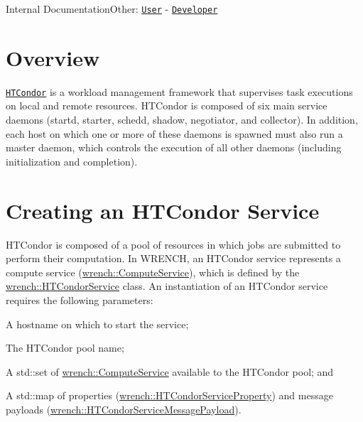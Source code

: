 Internal DocumentationOther\+: \href{../user/guide-htcondor.html}{\tt User} -\/ \href{../developer/guide-htcondor.html}{\tt Developer}\hypertarget{guide-htcondor_guide-htcondor-overview}{}\section{Overview}\label{guide-htcondor_guide-htcondor-overview}
\href{http://htcondor.org}{\tt H\+T\+Condor} is a workload management framework that supervises task executions on local and remote resources. H\+T\+Condor is composed of six main service daemons ({\ttfamily startd}, {\ttfamily starter}, {\ttfamily schedd}, {\ttfamily shadow}, {\ttfamily negotiator}, and {\ttfamily collector}). In addition, each host on which one or more of these daemons is spawned must also run a {\ttfamily master} daemon, which controls the execution of all other daemons (including initialization and completion).\hypertarget{guide-htcondor_guide-htcondor-creating}{}\section{Creating an H\+T\+Condor Service}\label{guide-htcondor_guide-htcondor-creating}
H\+T\+Condor is composed of a pool of resources in which jobs are submitted to perform their computation. In W\+R\+E\+N\+CH, an H\+T\+Condor service represents a compute service ({\ttfamily \hyperlink{classwrench_1_1_compute_service}{wrench\+::\+Compute\+Service}}), which is defined by the {\ttfamily \hyperlink{classwrench_1_1_h_t_condor_service}{wrench\+::\+H\+T\+Condor\+Service}} class. An instantiation of an H\+T\+Condor service requires the following parameters\+:


\begin{DoxyItemize}
\item A hostname on which to start the service;
\item The H\+T\+Condor pool name;
\item A {\ttfamily std\+::set} of {\ttfamily \hyperlink{classwrench_1_1_compute_service}{wrench\+::\+Compute\+Service}} available to the H\+T\+Condor pool; and
\item A {\ttfamily std\+::map} of properties ({\ttfamily \hyperlink{classwrench_1_1_h_t_condor_service_property}{wrench\+::\+H\+T\+Condor\+Service\+Property}}) and message payloads ({\ttfamily \hyperlink{classwrench_1_1_h_t_condor_service_message_payload}{wrench\+::\+H\+T\+Condor\+Service\+Message\+Payload}}).
\end{DoxyItemize}

